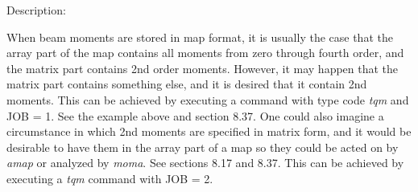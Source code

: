 \vspace{5mm}
     Description:
\vspace{2mm}

When beam moments are stored in map format, it is usually the case that the array part of the map contains all moments from zero through fourth order, and the matrix part contains 2nd order moments.  However, it may happen that the matrix part contains something else, and it is desired that it contain 2nd moments.  This can be achieved by executing a command with type code {\em tqm} and JOB = 1.  See the example above and section 8.37.  One could also imagine a circumstance in which 2nd moments are specified in matrix form, and it would be desirable to have them in the array part of a map so they could be acted on by {\em amap} or analyzed by {\em moma}.  See sections 8.17 and 8.37.  This can be achieved by executing a {\em tqm} command with JOB = 2.


\newpage

